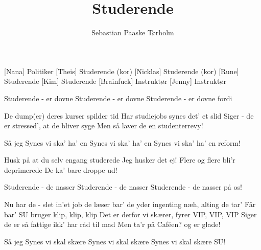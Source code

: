 \documentclass[a4paper,11pt]{article}
\title{Studerende}
\author{Sebastian Paaske Tørholm}
\begin{document}
\maketitle

\begin{roles}
[Nana] Politiker
[Theis] Studerende (kor)
[Nicklas] Studerende (kor)
[Rune] Studerende
[Kim] Studerende
[Brainfuck] Instruktør
[Jenny] Instruktør
\end{roles}

\begin{song}
%
Studerende - er dovne
Studerende - er dovne
Studerende - er dovne fordi

De dump(er) deres kurser
spilder tid
Har studiejobs
synes det' et slid
Siger - de er stressed',
at de bliver syge
Men så laver de en studenterrevy!

Så jeg
Synes vi ska' ha' en
Synes vi ska' ha' en
Synes vi ska' ha' en reform!

 Husk på at du selv engang studerede
 Jeg husker det ej!
 Flere og flere bli'r deprimerede
 De ka' bare droppe ud!

%
Studerende - de nasser
Studerende - de nasser
Studerende - de nasser på os!

Nu har de - slet in'et job
de læser bar'
de yder ingenting
næh, alting de tar'
Får bar' SU
bruger klip, klip, klip
Det er derfor
vi skærer, fyrer VIP, VIP, VIP
Siger de er så fattige
ikk' har råd til mad
Men ta'r på Caféen? og er glade!

Så jeg
Synes vi skal skære
Synes vi skal skære
Synes vi skal skære SU!

\end{song}
\end{document}
